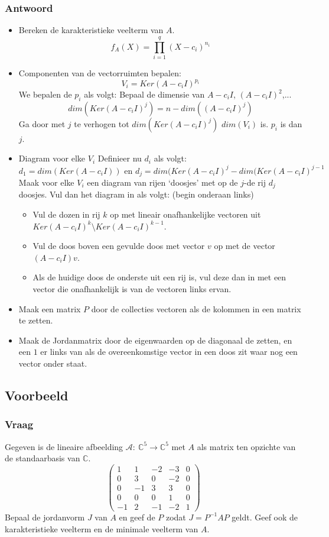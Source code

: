 \documentclass[main.tex]{subfiles}
\begin{document}
\subsubsection*{Antwoord}
\begin{itemize}
\item Bereken de karakteristieke veelterm van $A$.
  \[ f_{A}(X) = \prod_{i=1}^{q}(X-c_{i})^{n_{i}} \]
\item Componenten van de vectorruimten bepalen:
  \[ V_{i} = Ker(A-c_{i}I)^{p_{i}} \]
  We bepalen de $p_{i}$ als volgt:
  Bepaal de dimensie van $A-c_{i}I$, $(A-c_{i}I)^{2}$,...
  \[ dim(Ker(A-c_{i}I)^{j}) = n-dim((A-c_{i}I)^{j}) \]
  Ga door met $j$ te verhogen tot $dim(Ker(A-c_{i}I)^{j})$ $dim(V_{i})$ is.
  $p_{i}$ is dan $j$.
\item Diagram voor elke $V_{i}$
  Definieer nu $d_{i}$ als volgt:
  \[ d_{1} = dim(Ker(A-c_{i}I)) \text{ en } d_{j} = dim(Ker(A-c_{i}I)^{j}-dim(Ker(A-c_{i}I)^{j-1} \]
  Maak voor elke $V_{i}$ een diagram van rijen `doosjes' met op de $j$-de rij $d_{j}$ doosjes.
  Vul dan het diagram in als volgt: (begin onderaan links)
  \begin{itemize}
  \item Vul de dozen in rij $k$ op met lineair onafhankelijke vectoren uit $Ker(A-c_{i}I)^{k}\setminus Ker(A-c_{i}I)^{k-1}$.
  \item Vul de doos boven een gevulde doos met vector $v$ op met de vector $(A-c_{i}I)v$.
  \item Als de huidige doos de onderste uit een rij is, vul deze dan in met een vector die onafhankelijk is van de vectoren links ervan.
  \end{itemize}
\item Maak een matrix $P$ door de collecties vectoren als de kolommen in een matrix te zetten.
\item Maak de Jordanmatrix door de eigenwaarden op de diagonaal de zetten, en een $1$ er links van als de overeenkomstige vector in een doos zit waar nog een vector onder staat.
\end{itemize}

\subsection*{Voorbeeld}

\subsubsection*{Vraag}
Gegeven is de lineaire afbeelding $\mathcal{A}:\ \mathbb{C}^{5} \rightarrow \mathbb{C}^{5}$ met $A$ als matrix ten opzichte van de standaarbasis van $\mathbb{C}$.
\[
\begin{pmatrix}
  1 & 1 & -2 & -3 & 0\\
  0 & 3 & 0 & -2 & 0\\
  0 & -1 & 3 & 3 & 0\\
  0 & 0 & 0 & 1 & 0\\
  -1 & 2 & -1 & -2 & 1
\end{pmatrix}
\]
Bepaal de jordanvorm $J$ van $A$ en geef de $P$ zodat $J=P^{-1}AP$ geldt.
Geef ook de karakteristieke veelterm en de minimale veelterm van $A$.
\end{document}

